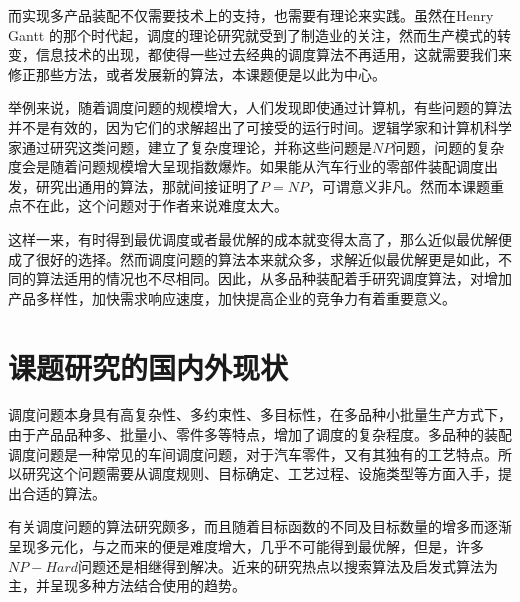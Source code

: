 而实现多产品装配不仅需要技术上的支持，也需要有理论来实践。虽然在Henry Gantt 的那个时代起，调度的理论研究就受到了制造业的关注，然而生产模式的转变，信息技术的出现，都使得一些过去经典的调度算法不再适用，这就需要我们来修正那些方法，或者发展新的算法，本课题便是以此为中心。

举例来说，随着调度问题的规模增大，人们发现即使通过计算机，有些问题的算法并不是有效的，因为它们的求解超出了可接受的运行时间。逻辑学家和计算机科学家通过研究这类问题，建立了复杂度理论，并称这些问题是$NP$问题，问题的复杂度会是随着问题规模增大呈现指数爆炸。如果能从汽车行业的零部件装配调度出发，研究出通用的算法，那就间接证明了$P=NP$，可谓意义非凡。然而本课题重点不在此，这个问题对于作者来说难度太大。

这样一来，有时得到最优调度或者最优解的成本就变得太高了，那么近似最优解便成了很好的选择。然而调度问题的算法本来就众多，求解近似最优解更是如此，不同的算法适用的情况也不尽相同。因此，从多品种装配着手研究调度算法，对增加产品多样性，加快需求响应速度，加快提高企业的竞争力有着重要意义。

\section{课题研究的国内外现状}
调度问题本身具有高复杂性、多约束性、多目标性，在多品种小批量生产方式下，由于产品品种多、批量小、零件多等特点，增加了调度的复杂程度。多品种的装配调度问题是一种常见的车间调度问题，对于汽车零件，又有其独有的工艺特点。所以研究这个问题需要从调度规则、目标确定、工艺过程、设施类型等方面入手，提出合适的算法。

有关调度问题的算法研究颇多，而且随着目标函数的不同及目标数量的增多而逐渐呈现多元化，与之而来的便是难度增大，几乎不可能得到最优解，但是，许多$NP - Hard$问题还是相继得到解决。近来的研究热点以搜索算法及启发式算法为主，并呈现多种方法结合使用的趋势。
